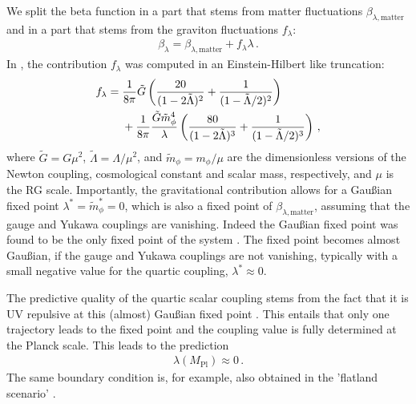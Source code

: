 \documentclass[aps,prd,twocolumn,preprintnumbers,superscriptaddress,nobibnotes,floatfix,longbibliography]{revtex4-1}
\begin{document}
We split the beta function in a part that stems from matter fluctuations $\beta_{\lambda,\text{matter}}$ and in a part that stems from the graviton fluctuations $f_\lambda$:
\begin{align} \label{eq:beta-lambda}
 \beta_{\lambda} = \beta_{\lambda,\text{matter}} + f_\lambda  \lambda \,.
\end{align}
In \cite{Pawlowski:2018ixd}, the contribution $f_\lambda$ was computed in an Einstein-Hilbert like truncation:
\begin{align}
 f_\lambda ={}& \frac{1}{8 \pi}  \tilde G \left( \frac{20}{(1 - 2 \tilde \Lambda)^2} + \frac{1}{(1- \tilde \Lambda/2)^2} \right) \notag \\
 &+ \frac{1}{8 \pi}  \frac{\tilde G  \tilde m_\phi^4}{\lambda} \left( \frac{80}{(1 - 2 \tilde \Lambda)^3} + \frac{1}{(1 - \tilde \Lambda/2)^3} \right)  \,,
\end{align}
where $\tilde G=G \mu^2$, $\tilde \Lambda =\Lambda/\mu^2$,  and $\tilde m_\phi = m_\phi/\mu$ are the dimensionless versions of the Newton coupling, cosmological constant and scalar mass, respectively, and $\mu$ is the RG scale.
Importantly, the gravitational contribution allows for a Gau\ss ian fixed point $\lambda^* =\tilde m_\phi^*=0$,
which is also a fixed point of $ \beta_{\lambda,\text{matter}}$, assuming that the gauge and Yukawa couplings are vanishing.
Indeed the Gau\ss ian fixed point was found to be the only fixed point of the system \cite{Eichhorn:2017als,Pawlowski:2018ixd}.
The fixed point becomes almost Gau\ss ian, if the gauge and Yukawa couplings are not vanishing, 
typically with a small negative value for the quartic coupling, $\lambda^*\approx 0$.

The predictive quality of the quartic scalar coupling \cite{Shaposhnikov:2009pv}
stems from the fact that it is UV repulsive at this (almost) Gau\ss ian fixed point \cite{Eichhorn:2017als,Pawlowski:2018ixd}.
This entails that only one trajectory leads to the fixed point and the coupling value is fully determined at the Planck scale.
This leads to the prediction 
\begin{align}
 \label{eq:prediction-lambda}
 \lambda (M_\text{Pl}) \approx 0 \,.
\end{align}
The same boundary condition is, for example, also obtained in the 'flatland scenario' \cite{1310.4304,1401.5944}.
\end{document}

